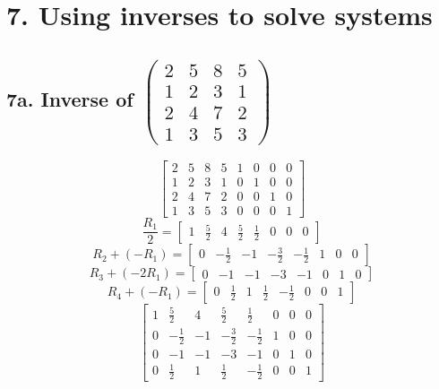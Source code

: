 \documentclass[11pt]{article}
\begin{document}
\section*{7. Using inverses to solve systems}
\subsection*{7a. Inverse of \(
    \begin{pmatrix}
        2 & 5 & 8 & 5 \\
        1 & 2 & 3 & 1 \\
        2 & 4 & 7 & 2 \\
        1 & 3 & 5 & 3
    \end{pmatrix}
    \)}
\[
    \left[
    \begin{array}{cccc|cccc}
        2 & 5 & 8 & 5 & 1 & 0 & 0 & 0 \\
        1 & 2 & 3 & 1 & 0 & 1 & 0 & 0 \\
        2 & 4 & 7 & 2 & 0 & 0 & 1 & 0 \\
        1 & 3 & 5 & 3 & 0 & 0 & 0 & 1
    \end{array}
    \right]
\]
\[
    \frac{R_1}{2} = 
    \left[
    \begin{array}{cccc|cccc}
        1 & \frac{5}{2} & 4 & \frac{5}{2} & \frac{1}{2} & 0 & 0 & 0
    \end{array}
    \right]
\]
\[
    R_2 + (-R_1) = 
    \left[
    \begin{array}{cccc|cccc}
        0 & -\frac{1}{2} & -1 & -\frac{3}{2} & -\frac{1}{2} & 1 & 0 & 0
    \end{array}
    \right]
\]
\[
    R_3 + (-2R_1) = 
    \left[
    \begin{array}{cccc|cccc}
        0 & -1 & -1 & -3 & -1 & 0 & 1 & 0
    \end{array}
    \right]
\]
\[
    R_4 + (-R_1) = 
    \left[
    \begin{array}{cccc|cccc}
        0 & \frac{1}{2} & 1 & \frac{1}{2} & -\frac{1}{2} & 0 & 0 & 1
    \end{array}
    \right]
\]
\[
    \left[
    \begin{array}{cccc|cccc}
        1 & \frac{5}{2} & 4 & \frac{5}{2} & \frac{1}{2} & 0 & 0 & 0 \\
        0 & -\frac{1}{2} & -1 & -\frac{3}{2} & -\frac{1}{2} & 1 & 0 & 0 \\
        0 & -1 & -1 & -3 & -1 & 0 & 1 & 0 \\
        0 & \frac{1}{2} & 1 & \frac{1}{2} & -\frac{1}{2} & 0 & 0 & 1
    \end{array}
    \right]
\]
\end{document}
